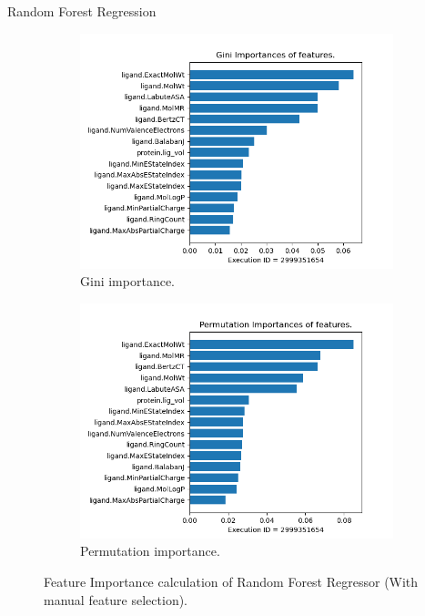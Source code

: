 \documentclass{beamer}
\begin{document}
\begin{frame}[t]{Random Forest Regression}

\begin{figure}
     \centering
     \begin{subfigure}[b]{0.49\textwidth}
         \centering
         \includegraphics[scale=0.23]{images/Gini_importance}
         \caption{Gini importance.}
        \label{fig:GiniImportanceLabel}
     \end{subfigure}
     \hfill
     \begin{subfigure}[b]{0.49\textwidth}
         \centering
         \includegraphics[scale=0.23]{images/Permutation_importance}
        \caption{Permutation importance.}
        \label{fig:PermutationImportanceLabel}
     \end{subfigure}
     \caption{Feature Importance calculation of Random Forest Regressor (With manual feature selection).}
     \label{fig:RFMFILable}
\end{figure}


\end{frame}
\end{document}
